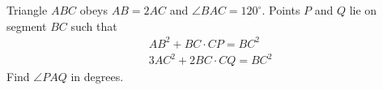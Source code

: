 Triangle $ ABC$ obeys $ AB = 2AC$ and $ \angle{BAC} = 120^{\circ}.$ Points $ P$ and $ Q$ lie on segment $ BC$ such that
\begin{eqnarray*}
AB^2 + BC \cdot CP = BC^2 \\
3AC^2 + 2BC \cdot CQ = BC^2
\end{eqnarray*}
Find $ \angle{PAQ}$ in degrees.